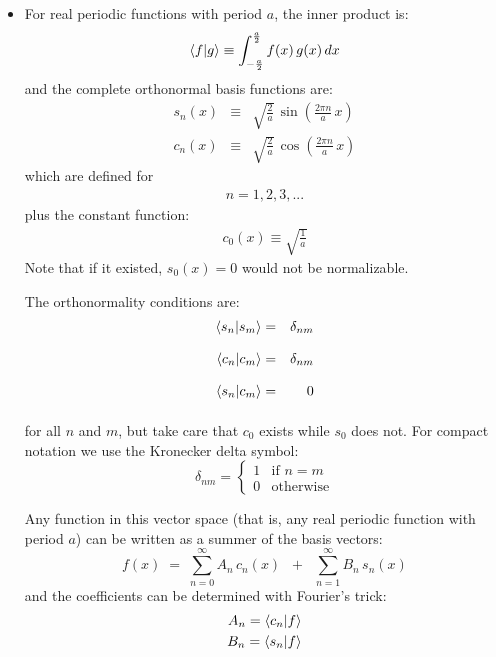 \documentclass[12pt]{article}
\begin{document}
\begin{itemize}
\item For real periodic functions with period $a$, the inner product is:
\begin{equation}
\braket{f|g} \equiv \int_{-\frac{a}{2}}^{\frac{a}{2}} f(x) \, g(x) \, dx
\end{equation}
and the complete orthonormal basis functions are:
\begin{eqnarray}
s_n(x) &\equiv& \sqrt{\frac{2}{a}}\,\sin\left(\frac{2\pi n}{a} \, x \right)\\
c_n(x) &\equiv& \sqrt{\frac{2}{a}}\,\cos\left(\frac{2\pi n}{a} \, x \right)
\end{eqnarray}
which are defined for
\begin{eqnarray*}
n = 1,2,3,...
\end{eqnarray*}
plus the constant function:
\begin{eqnarray}
c_0(x) \equiv \sqrt{\frac{1}{a}}
\end{eqnarray}
Note that if it existed, $s_0(x) = 0$ would not be normalizable.

The orthonormality conditions are:
\begin{eqnarray}
\braket{s_n | s_m} &=& \delta_{nm}\notag\\[8pt]
\braket{c_n | c_m} &=& \delta_{nm}\notag\\[8pt]
\braket{s_n | c_m} &=& 0\notag\\[8pt]
\end{eqnarray}
for all $n$ and $m$, but take care that $c_0$ exists while $s_0$ does not.  
For compact notation we use the Kronecker delta symbol:
\begin{displaymath}
\delta_{nm} =  
\left\{
        \begin{array}{ll}
                1  & \mbox{if } n=m \\
                0 & \mbox{otherwise}
        \end{array}
\right.
\end{displaymath}

Any function in this vector space (that is, any real periodic function with period $a$) can be written as a summer of the basis vectors:
\begin{equation}
f(x) \; = \; \sum_{n=0}^{\infty}  A_n \, c_n(x)  \; \; + \; \; \sum_{n=1}^{\infty} B_n \, s_n(x) \label{eqn:bfs}
\end{equation}
and the coefficients can be determined with Fourier's trick:
\begin{eqnarray*}
A_n = \braket{c_n| f} \\
B_n = \braket{s_n| f}
\end{eqnarray*}


\end{itemize}
\end{document}

